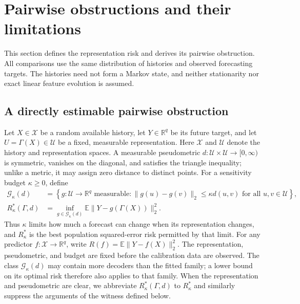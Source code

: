\section{Pairwise obstructions and their limitations}
\label{sec:theory}

This section defines the representation risk and derives its pairwise
obstruction. All comparisons use the same distribution of histories and
observed forecasting targets. The histories need not form a Markov state,
and neither stationarity nor exact linear feature evolution is assumed.

\subsection{A directly estimable pairwise obstruction}

Let $X\in\mathcal X$ be a random available history, let
$Y\in\mathbb R^q$ be its future target, and let
$U=\Gamma(X)\in\mathcal U$ be a fixed, measurable representation. Here
$\mathcal X$ and $\mathcal U$ denote the history and representation spaces.
A measurable pseudometric $d:\mathcal U\times\mathcal U\to[0,\infty)$ is symmetric,
vanishes on the diagonal, and satisfies the triangle inequality; unlike a
metric, it may assign zero distance to distinct points. For a sensitivity
budget $\kappa\geq0$, define
\begin{align*}
 \mathcal G_\kappa(d)
 &=\left\{g:\mathcal U\to\mathbb R^q\text{ measurable}:
       \|g(u)-g(v)\|_2\leq\kappa d(u,v)
       \text{ for all }u,v\in\mathcal U\right\},\\
 R^*_\kappa(\Gamma,d)
 &=\inf_{g\in\mathcal G_\kappa(d)}
             \mathbb E\|Y-g(\Gamma(X))\|_2^2.
\end{align*}
Thus $\kappa$ limits how much a forecast can change when its representation
changes, and $R^*_\kappa$ is the best population squared-error risk permitted
by that limit. For any predictor $f:\mathcal X\to\mathbb R^q$, write
$R(f)=\mathbb E\|Y-f(X)\|_2^2$. The representation, pseudometric, and
budget are fixed before the calibration data are observed. The class
$\mathcal G_\kappa(d)$ may contain more decoders than the fitted family;
a lower bound on its optimal risk therefore also applies to that family.
When the representation and pseudometric are clear, we abbreviate
$R^*_\kappa(\Gamma,d)$ to $R^*_\kappa$ and similarly suppress the
arguments of the witness defined below.

